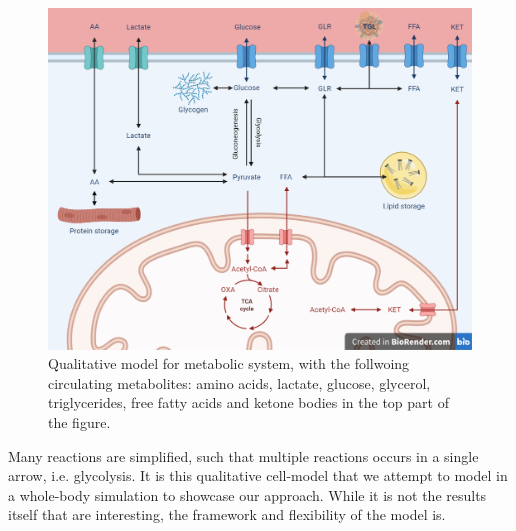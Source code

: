\documentclass{IEEEtran}
\begin{document}
\begin{figure}[H]
    \centering
    \includegraphics[width=\columnwidth]{Diagrams/Qualitative model.png}
    \caption{Qualitative model for metabolic system, with the follwoing circulating metabolites: amino acids, lactate, glucose, glycerol, triglycerides, free fatty acids and ketone bodies in the top part of the figure.}
    \label{fig:Qualitative_cell}
\end{figure}

Many reactions are simplified, such that multiple reactions occurs in a single arrow, i.e. glycolysis. It is this qualitative cell-model that we attempt to model in a whole-body simulation to showcase our approach. While it is not the results itself that are interesting, the framework and flexibility of the model is. \\
\end{document}
